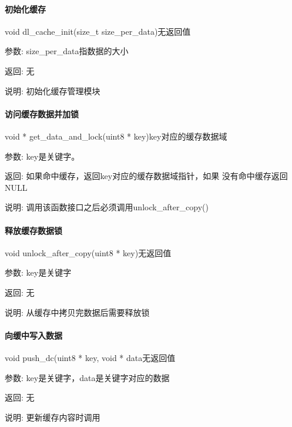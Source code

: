 \paragraph{初始化缓存}
{void dl\_cache\_init(size\_t size\_per\_data)}{无返回值}
	\begin{compactdesc}
	\item[参数:]size\_per\_data指数据的大小
	\item[返回:]无
	\item[说明:]初始化缓存管理模块
	\end{compactdesc}

\paragraph{访问缓存数据并加锁}
{void * get\_data\_and\_lock(uint8 * key)}{key对应的缓存数据域}
	\begin{compactdesc}
	\item[参数:]key是关键字。
	\item[返回:]如果命中缓存，返回key对应的缓存数据域指针，如果
	没有命中缓存返回NULL
	\item[说明:]调用该函数接口之后必须调用unlock\_after\_copy()
	\end{compactdesc}
	
\paragraph{释放缓存数据锁}
{void unlock\_after\_copy(uint8 * key)}{无返回值}
	\begin{compactdesc}
	\item[参数:]key是关键字
	\item[返回:]无
	\item[说明:]从缓存中拷贝完数据后需要释放锁
	\end{compactdesc}
	
\paragraph{向缓中写入数据}
{void push\_dc(uint8 * key, void * data}{无返回值}
	\begin{compactdesc}
	\item[参数:]key是关键字，data是关键字对应的数据
	\item[返回:]无
	\item[说明:]更新缓存内容时调用
	\end{compactdesc}

